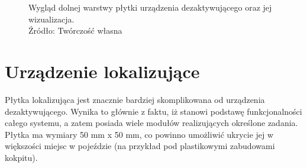 \begin{figure}[H]
\centering
	\qquad
	
	\caption{Wygląd dolnej warstwy płytki urządzenia dezaktywującego oraz jej wizualizacja. \\ Źródło: Twórczość własna}
	\label{fig:image_key_tag_bottom_board}
\end{figure}

\section{Urządzenie lokalizujące}

Płytka lokalizująca jest znacznie bardziej skomplikowana od urządzenia dezaktywującego. Wynika to głównie z faktu, iż stanowi podstawę funkcjonalności całego systemu, a zatem posiada wiele modułów realizujących określone zadania. Płytka ma wymiary 50 mm x 50 mm, co powinno umożliwić ukrycie jej w większości miejsc w pojeździe (na przykład pod plastikowymi zabudowami kokpitu). 

